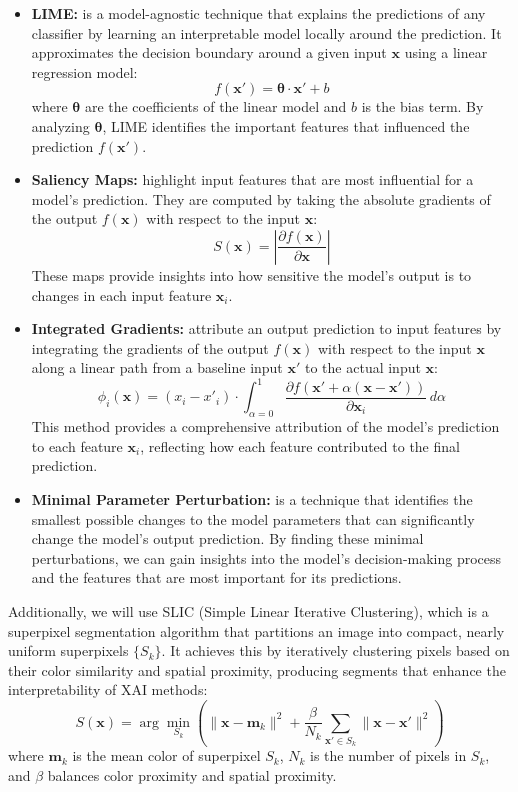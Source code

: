 \documentclass[journal, a4paper]{IEEEtran}
\begin{document}
\begin{itemize}
    \item \textbf{LIME:}
    is a model-agnostic technique that explains the predictions of any classifier by learning an interpretable model locally around the prediction.
    It approximates the decision boundary around a given input \( \mathbf{x} \) using a linear regression model:
    \[
    f(\mathbf{x}') = \boldsymbol{\theta} \cdot \mathbf{x}' + b
    \]
    where \( \boldsymbol{\theta} \) are the coefficients of the linear model and \( b \) is the bias term.
    By analyzing \( \boldsymbol{\theta} \), LIME identifies the important features that influenced the prediction \( f(\mathbf{x}') \).

    \item \textbf{Saliency Maps:}
    highlight input features that are most influential for a model's prediction.
    They are computed by taking the absolute gradients of the output \( f(\mathbf{x}) \) with respect to the input \( \mathbf{x} \):
    \[
    S(\mathbf{x}) = \left|\frac{\partial f(\mathbf{x})}{\partial \mathbf{x}}\right|
    \]
    These maps provide insights into how sensitive the model's output is to changes in each input feature \( \mathbf{x}_i \).

    \item \textbf{Integrated Gradients:}
    attribute an output prediction to input features by integrating the gradients of the output \( f(\mathbf{x}) \) with respect to the input \( \mathbf{x} \) along a linear path from a baseline input \( \mathbf{x}' \) to the actual input \( \mathbf{x} \):
    \[
    \phi_i(\mathbf{x}) = (x_i - x'_i) \cdot \int_{\alpha=0}^{1} \frac{\partial f(\mathbf{x}' + \alpha (\mathbf{x} - \mathbf{x}'))}{\partial \mathbf{x}_i} \, d\alpha
    \]
    This method provides a comprehensive attribution of the model's prediction to each feature \( \mathbf{x}_i \), reflecting how each feature contributed to the final prediction.

    \item \textbf{Minimal Parameter Perturbation:}
    is a technique that identifies the smallest possible changes to the model parameters that can significantly change the model's output prediction.
    By finding these minimal perturbations, we can gain insights into the model's decision-making process and the features that are most important for its predictions.
\end{itemize}

Additionally, we will use SLIC (Simple Linear Iterative Clustering), which is a superpixel segmentation algorithm that partitions an image into compact, nearly uniform superpixels \( \{ S_k \} \).
It achieves this by iteratively clustering pixels based on their color similarity and spatial proximity, producing segments that enhance the interpretability of XAI methods:
\[
S(\mathbf{x}) = \arg \min_{S_k} \left( \|\mathbf{x} - \mathbf{m}_k\|^2 + \frac{\beta}{N_k} \sum_{\mathbf{x}' \in S_k} \|\mathbf{x} - \mathbf{x}'\|^2 \right)
\]
where \( \mathbf{m}_k \) is the mean color of superpixel \( S_k \), \( N_k \) is the number of pixels in \( S_k \), and \( \beta \) balances color proximity and spatial proximity.
\end{document}
